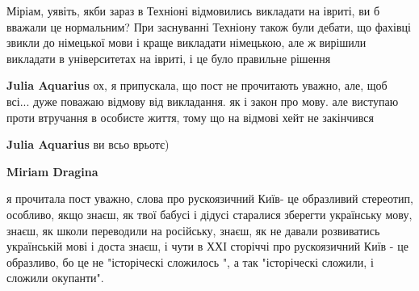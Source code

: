 \begin{itemize}
 

Міріам, уявіть, якби зараз в Техніоні відмовились викладати на івриті, ви б
вважали це нормальним? При заснуванні Техніону також були дебати, що фахівці
звикли до німецької мови і краще викладати німецькою, але ж вирішили викладати
в університетах на івриті, і це було правильне рішення


\begin{itemize}
 
\textbf{Julia Aquarius} ох, я припускала, що пост не прочитають уважно, але, щоб всі... дуже поважаю відмову від викладання. як і закон про мову. але виступаю проти втручання в особисте життя, тому що на відмові хейт не закінчився

 
\textbf{Julia Aquarius} ви всьо врьотє)

 
\textbf{Miriam Dragina} 

я прочитала пост уважно, слова про рускоязичний Київ-
це образливий стереотип, особливо, якщо знаєш, як твої бабусі і дідусі
старалися зберегти українську мову, знаєш, як школи переводили на російську,
знаєш, як не давали розвиватись українській мові і доста знаєш, і чути в ХХІ
сторіччі про рускоязичний Київ - це образливо, бо це не "історіческі сложилось
", а так "історіческі сложили, і сложили окупанти".


 

\end{itemize}
\end{itemize}

